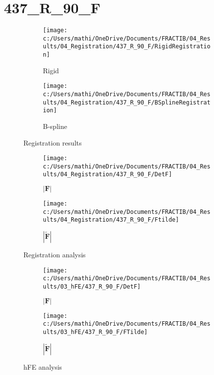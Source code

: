 \documentclass{article}%
\begin{document}
%
\newpage%
\section*{437\_R\_90\_F}%
\label{sec:437R90F}%


\begin{figure}[h!]%
\begin{subfigure}[b]{0.5\linewidth}%
\texttt{[image: c:/Users/mathi/OneDrive/Documents/FRACTIB/04\_Results/04\_Registration/437\_R\_90\_F/RigidRegistration]}%
\caption{Rigid}%
\end{subfigure}%
\begin{subfigure}[b]{0.5\linewidth}%
\texttt{[image: c:/Users/mathi/OneDrive/Documents/FRACTIB/04\_Results/04\_Registration/437\_R\_90\_F/BSplineRegistration]}%
\caption{B{-}spline}%
\end{subfigure}%
\caption{Registration results}%
\end{figure}

%


\begin{figure}[h!]%
\begin{subfigure}[b]{0.5\linewidth}%
\texttt{[image: c:/Users/mathi/OneDrive/Documents/FRACTIB/04\_Results/04\_Registration/437\_R\_90\_F/DetF]}%
\caption{$|\mathbf{F}|$}%
\end{subfigure}%
\begin{subfigure}[b]{0.5\linewidth}%
\texttt{[image: c:/Users/mathi/OneDrive/Documents/FRACTIB/04\_Results/04\_Registration/437\_R\_90\_F/Ftilde]}%
\caption{$|\widetilde{\mathbf{F}}|$}%
\end{subfigure}%
\caption{Registration analysis}%
\end{figure}

%


\begin{figure}[h!]%
\begin{subfigure}[b]{0.5\linewidth}%
\texttt{[image: c:/Users/mathi/OneDrive/Documents/FRACTIB/04\_Results/03\_hFE/437\_R\_90\_F/DetF]}%
\caption{$|\mathbf{F}|$}%
\end{subfigure}%
\begin{subfigure}[b]{0.5\linewidth}%
\texttt{[image: c:/Users/mathi/OneDrive/Documents/FRACTIB/04\_Results/03\_hFE/437\_R\_90\_F/FTilde]}%
\caption{$|\widetilde{\mathbf{F}}|$}%
\end{subfigure}%
\caption{hFE analysis}%
\end{figure}

%
\newpage%
\end{document}
